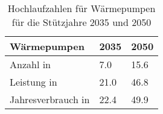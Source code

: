 {
\renewcommand{\arraystretch}{1.2}%
\begin{table}[H]
	\begin{center}
		\caption{Hochlaufzahlen für Wärmepumpen für die Stützjahre \num{2035} und \num{2050}}
		\begin{tabu} to \textwidth {X[1] X[1, r] X[1, r]}
			\hline
			Wärmepumpen                  & \num{2035} & \num{2050} \\ \hline
			Anzahl in \si{\MioStkSC}     & \num{7.0}  & \num{15.6} \\
			Leistung in \si{\gw}         & \num{21.0} & \num{46.8} \\
			Jahresverbrauch in \si{\twh} & \num{22.4} & \num{49.9} \\ \hline
		\end{tabu}
		\label{tab:WP-RampUp}
	\end{center}
	\vspace{-3mm}%
\end{table}
}
